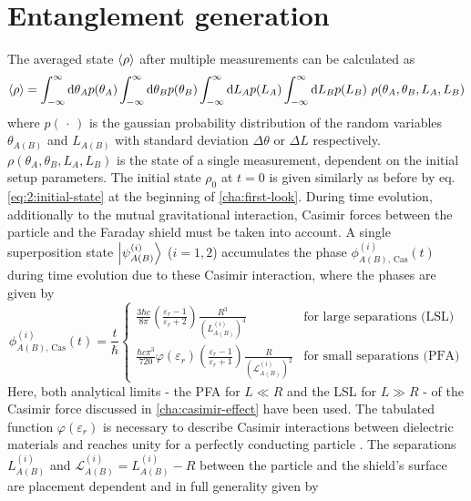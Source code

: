 \section{Entanglement generation}\label{sec:4:entanglement-generation}
The averaged state $\left\langle\rho\right\rangle$ after multiple measurements can be calculated as
\begin{equation}\label{eq:4:average-density}
  \left\langle\rho\right\rangle = \int_{-\infty}^{\infty} \dd \theta_A p(\theta_A) \int_{-\infty}^{\infty} \dd \theta_B p(\theta_B) \int_{-\infty}^{\infty} \dd L_A p(L_A) \int_{-\infty}^{\infty} \dd L_B p(L_B) \ \rho(\theta_A, \theta_B, L_A, L_B)
\end{equation} 
where $p(\,\cdot\,)$ is the gaussian probability distribution of the random variables $\theta_{A(B)}$ and $L_{A(B)}$ with standard deviation $\Delta \theta$ or $\Delta L$ respectively. 
$\rho(\theta_A, \theta_B, L_A, L_B)$ is the state of a single measurement, dependent on the initial setup parameters.
The initial state $\rho_0$ at $t=0$ is given similarly as before by eq. \eqref{eq:2:initial-state} at the beginning of \cref{cha:first-look}.
During time evolution, additionally to the mutual gravitational interaction, Casimir forces between the particle and the Faraday shield must be taken into account.
A single superposition state $\ket{\psi^{(i)}_{A(B)}}$ ($i = 1, 2$) accumulates the phase $\phi^{(i)}_{A(B),\,\mathrm{Cas}}(t)$ during time evolution due to these Casimir interaction, where the phases are given by
\begin{equation}
  \phi^{(i)}_{A(B),\,\mathrm{Cas}}(t) = \frac{t}{\hbar}
  \begin{cases}
     \frac{3 \hbar c}{8 \pi} \left(\frac{\varepsilon_r - 1}{\varepsilon_r + 2}\right) \frac{R^3}{(L^{(i)}_{A(B)})^4} & \text{for large separations (LSL)} \\
    \frac{\hbar c \pi^3}{720} \varphi(\varepsilon_r) \left(\frac{\varepsilon_r - 1}{\varepsilon_r + 1}\right) \frac{R}{(\mathscr{L}^{(i)}_{A(B)})^2} & \text{for small separations (PFA)}
  \end{cases}
\end{equation}
Here, both analytical limits - the PFA for $L \ll R$ and the LSL for $L \gg R$ - of the Casimir force discussed in \cref{cha:casimir-effect} have been used.
The tabulated function $\varphi(\varepsilon_r)$ is necessary to describe Casimir interactions between dielectric materials and reaches unity for a perfectly conducting particle \cite{Lifshitz_1956}.
The separations $L^{(i)}_{A(B)}$ and $\mathscr{L}^{(i)}_{A(B)} = L^{(i)}_{A(B)}-R$ between the particle and the shield's surface are placement dependent and in full generality given by
